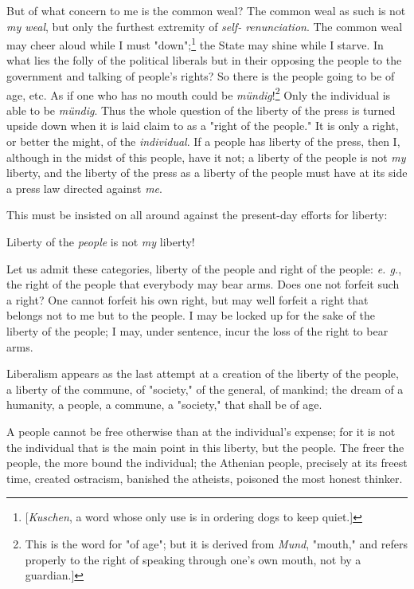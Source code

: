 But of what concern to me is the common weal? The common weal as such is not 
\textit{my weal}, but only the furthest extremity of \textit{self- 
renunciation}. The common weal may cheer aloud while I must 
"{}down"{};\footnote{[\textit{Kuschen}, a word whose only use is in ordering 
dogs to keep quiet.]} the State may shine while I starve. In what lies the 
folly of the political liberals but in their opposing the people to the 
government and talking of people's rights? So there is the people going to be 
of age, etc. As if one who has no mouth could be 
\textit{m\"undig}!\footnote{This is the word for "{}of age"{}; but it is 
derived from \textit{Mund}, "{}mouth,"{} and refers properly to the right of 
speaking through one's own mouth, not by a guardian.]} Only the individual is 
able to be \textit{m\"undig}. Thus the whole question of the liberty of the 
press is turned upside down when it is laid claim to as a "{}right of the 
people."{} It is only a right, or better the might, of the 
\textit{individual}. If a people has liberty of the press, then I, although in 
the midst of this people, have it not; a liberty of the people is not 
\textit{my} liberty, and the liberty of the press as a liberty of the people 
must have at its side a press law directed against \textit{me}.

This must be insisted on all around against the present-day efforts for 
liberty:

Liberty of the \textit{people} is not \textit{my} liberty!

Let us admit these categories, liberty of the people and right of the people: 
\textit{e. g.}, the right of the people that everybody may bear arms. Does one 
not forfeit such a right? One cannot forfeit his own right, but may well 
forfeit a right that belongs not to me but to the people. I may be locked up 
for the sake of the liberty of the people; I may, under sentence, incur the 
loss of the right to bear arms.

Liberalism appears as the last attempt at a creation of the liberty of the 
people, a liberty of the commune, of "{}society,"{} of the general, of 
mankind; the dream of a humanity, a people, a commune, a "{}society,"{} that 
shall be of age.

A people cannot be free otherwise than at the individual's expense; for it is 
not the individual that is the main point in this liberty, but the people. The 
freer the people, the more bound the individual; the Athenian people, 
precisely at its freest time, created ostracism, banished the atheists, 
poisoned the most honest thinker.

